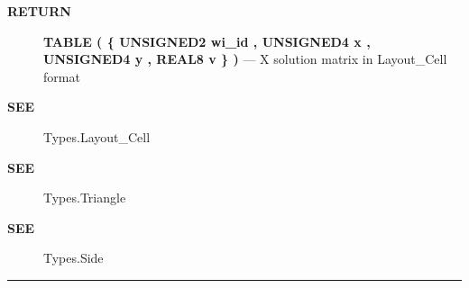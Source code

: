 \par
\begin{description}
\item [\colorbox{tagtype}{\color{white} \textbf{\textsf{RETURN}}}] \textbf{TABLE ( \{ UNSIGNED2 wi\_id , UNSIGNED4 x , UNSIGNED4 y , REAL8 v \} )} --- X solution matrix in Layout\_Cell format
\end{description}







\par
\begin{description}
\item [\colorbox{tagtype}{\color{white} \textbf{\textsf{SEE}}}] Types.Layout\_Cell
\item [\colorbox{tagtype}{\color{white} \textbf{\textsf{SEE}}}] Types.Triangle
\item [\colorbox{tagtype}{\color{white} \textbf{\textsf{SEE}}}] Types.Side
\end{description}



\rule{\linewidth}{0.5pt}
